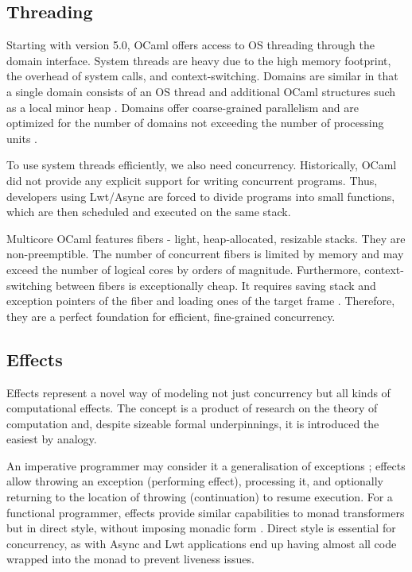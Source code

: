 \documentclass[12pt,a4paper,twoside]{report}
\begin{document}
\subsection{Threading}
\label{section:fibers}
Starting with version 5.0, OCaml offers access to OS threading through the domain interface. System threads are heavy due to the high memory footprint, the overhead of system calls, and context-switching. Domains are similar in that a single domain consists of an OS thread and additional OCaml structures such as a local minor heap \cite{Sivaramakrishnan2020}. Domains offer coarse-grained parallelism and are optimized for the number of domains not exceeding the number of processing units \cite{Concurre37:online}.

To use system threads efficiently, we also need concurrency. Historically, OCaml did not provide any explicit support for writing concurrent programs. Thus, developers using Lwt/Async are forced to divide programs into small functions, which are then scheduled and executed on the same stack. 

Multicore OCaml features fibers - light, heap-allocated, resizable stacks. They are non-preemptible. The number of concurrent fibers is limited by memory and may exceed the number of logical cores by orders of magnitude. Furthermore, context-switching between fibers is exceptionally cheap. It requires saving stack and exception pointers of the fiber and loading ones of the target frame \cite{Sivaramakrishnan2021}. Therefore, they are a perfect foundation for efficient, fine-grained concurrency. 

\subsection{Effects}
\label{section:effects}
Effects represent a novel way of modeling not just concurrency but all kinds of computational effects. The concept is a product of research on the theory of computation \cite{Pretnar2015} and, despite sizeable formal underpinnings, it is introduced the easiest by analogy. 

An imperative programmer may consider it a generalisation of exceptions \cite{Brachthuser2020}; effects allow throwing an exception (performing effect), processing it, and optionally returning to the location of throwing (continuation) to resume execution. For a functional programmer, effects provide similar capabilities to monad transformers but in direct style, without imposing monadic form \cite{Sivaramakrishnan2021}. Direct style is essential for concurrency, as with Async and Lwt applications end up having almost all code wrapped into the monad to prevent liveness issues.  
\end{document}
